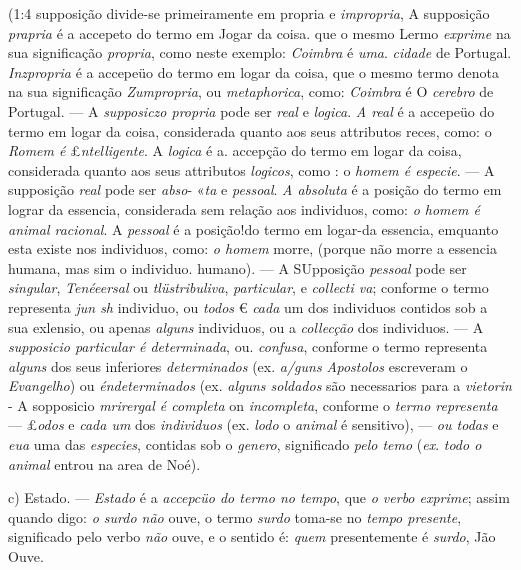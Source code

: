 (1:4 supposição divide-se primeiramente em propria e \emph{impropria}, A supposição \emph{prapria} é a accepeto do termo em Jogar da coisa. que o mesmo Lermo \emph{exprime} na sua significação \emph{propria}, como neste exemplo: \emph{Coimbra} é \emph{uma}. \emph{cidade} de Portugal. \emph{Inzpropria} é a accepeüo do termo em logar da coisa, que o mesmo termo denota na sua significação \emph{Zumpropria}, ou \emph{metaphorica}, como: \emph{Coimbra} é O \emph{cerebro} de Portugal. --- A \emph{supposiczo propria} pode ser \emph{real} e \emph{logica}. \emph{A real} é a accepeüo do termo em logar da coisa, considerada quanto aos seus attributos reces, como: o \emph{Romem é} £\emph{ntelligente}. A \emph{logica} é a. accepção do termo em logar da coisa, considerada quanto aos seus attributos \emph{logicos}, como : o \emph{homem é especie}. --- A supposição \emph{real} pode ser \emph{abso}- «\emph{ta} e \emph{pessoal}. \emph{A absoluta} é a posição do termo em lograr da essencia, considerada sem relação aos individuos, como: \emph{o homem é animal racional}. A \emph{pessoal} é a posição!do termo em logar-da essencia, emquanto esta existe nos individuos, como: \emph{o homem} morre, (porque não morre a essencia humana, mas sim o individuo. humano). --- A SUpposição \emph{pessoal} pode ser \emph{singular}, \emph{Tenéeersal} ou \emph{tlüstribuliva}, \emph{particular}, e \emph{collecti va}; conforme o termo representa \emph{jun sh} individuo, ou \emph{todos} € \emph{cada} um dos individuos contidos sob a sua exlensio, ou apenas \emph{alguns} individuos, ou a \emph{collecção} dos individuos. --- A \emph{supposicio particular é determinada}, ou. \emph{confusa}, conforme o termo representa \emph{alguns} dos seus inferiores \emph{determinados} (ex. \emph{a/guns Apostolos} escreveram o \emph{Evangelho}) ou \emph{éndeterminados} (ex. \emph{alguns soldados} são necessarios para a \emph{vietorin} - A sopposicio \emph{mrirergal é completa} on \emph{incompleta}, conforme o \emph{termo representa} --- £\emph{odos} e \emph{cada um} dos \emph{individuos} (ex. \emph{lodo} o \emph{animal} é sensitivo), --- \emph{ou todas} e \emph{eua} uma das \emph{especies}, contidas sob o \emph{genero}, significado \emph{pelo temo} (\emph{ex}. \emph{todo o animal} entrou na area de Noé).

c) Estado. --- \emph{Estado} é a \emph{accepcüo do termo no tempo}, que \emph{o verbo exprime}; assim quando digo: \emph{o surdo não} ouve, o termo \emph{surdo} toma-se no \emph{tempo presente}, significado pelo verbo \emph{não} ouve, e o sentido é: \emph{quem} presentemente é \emph{surdo}, Jão Ouve.


